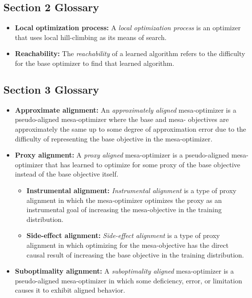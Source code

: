 \documentclass[
  onecolumn,
  natbib,
]{miri-tech-article}
\begin{document}
\subsection{Section 2 Glossary}
\begin{itemize}
\item \textbf{Local optimization process:} A \textit{local optimization process} is an optimizer that uses local hill-climbing as its means of search.
\item \textbf{Reachability:} The \textit{reachability} of a learned algorithm refers to the difficulty for the base optimizer to find that learned algorithm.
\end{itemize}

\subsection{Section 3 Glossary}
\begin{itemize}
\item \textbf{Approximate alignment:} An \textit{approximately aligned} mesa-optimizer is a pseudo-aligned mesa-optimizer where the base and mesa- objectives are approximately the same up to some degree of approximation error due to the difficulty of representing the base objective in the mesa-optimizer.
\item \textbf{Proxy alignment:} A \textit{proxy aligned} mesa-optimizer is a pseudo-aligned mesa-optimizer that has learned to optimize for some proxy of the base objective instead of the base objective itself.
  \begin{itemize}
  \item \textbf{Instrumental alignment:} \textit{Instrumental alignment} is a type of proxy alignment in which the mesa-optimizer optimizes the proxy as an instrumental goal of increasing the mesa-objective in the training distribution.
  \item \textbf{Side-effect alignment:} \textit{Side-effect alignment} is a type of proxy alignment in which optimizing for the mesa-objective has the direct causal result of increasing the base objective in the training distribution.
  \end{itemize}
\item \textbf{Suboptimality alignment:} A \textit{suboptimality aligned} mesa-optimizer is a pseudo-aligned mesa-optimizer in which some deficiency, error, or limitation causes it to exhibit aligned behavior.
\end{itemize}
\end{document}
